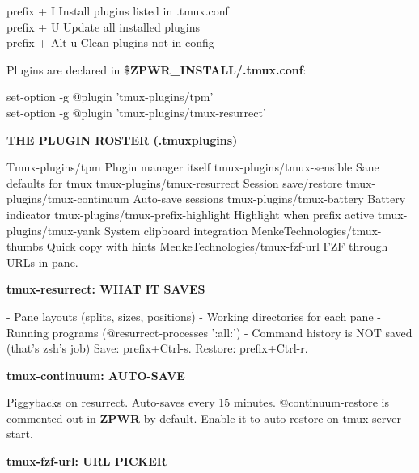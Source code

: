 \documentclass[11pt,a4paper,twoside]{book}
\begin{document}
\begin{codebox}
\color{neongreen}prefix + I       Install plugins listed in .tmux.conf\\
\color{neongreen}prefix + U       Update all installed plugins\\
\color{neongreen}prefix + Alt-u   Clean plugins not in config\\
\end{codebox}

Plugins are declared in \textbf{\$ZPWR\_INSTALL/.tmux.conf}:

\begin{codebox}
\color{neongreen}set-option -g @plugin 'tmux-plugins/tpm'\\
\color{neongreen}set-option -g @plugin 'tmux-plugins/tmux-resurrect'\\
\end{codebox}


\vspace{12pt}
{\bfseries\color{neonyellow} THE PLUGIN ROSTER (.tmuxplugins)}\vspace{4pt}

Tmux-plugins/tpm                Plugin manager itself tmux-plugins/tmux-sensible      Sane defaults for tmux tmux-plugins/tmux-resurrect     Session save/restore tmux-plugins/tmux-continuum      Auto-save sessions tmux-plugins/tmux-battery        Battery indicator tmux-plugins/tmux-prefix-highlight Highlight when prefix active tmux-plugins/tmux-yank           System clipboard integration MenkeTechnologies/tmux-thumbs     Quick copy with hints MenkeTechnologies/tmux-fzf-url    FZF through URLs in pane.


\vspace{12pt}
{\bfseries\color{neonyellow} tmux-resurrect: WHAT IT SAVES}\vspace{4pt}

- Pane layouts (splits, sizes, positions) - Working directories for each pane - Running programs (@resurrect-processes ':all:') - Command history is NOT saved (that's zsh's job) Save: prefix+Ctrl-s. Restore: prefix+Ctrl-r.


\vspace{12pt}
{\bfseries\color{neonyellow} tmux-continuum: AUTO-SAVE}\vspace{4pt}

Piggybacks on resurrect. Auto-saves every 15 minutes. @continuum-restore is commented out in \textbf{ZPWR} by default. Enable it to auto-restore on tmux server start.


\vspace{12pt}
{\bfseries\color{neonyellow} tmux-fzf-url: URL PICKER}\vspace{4pt}
\end{document}
